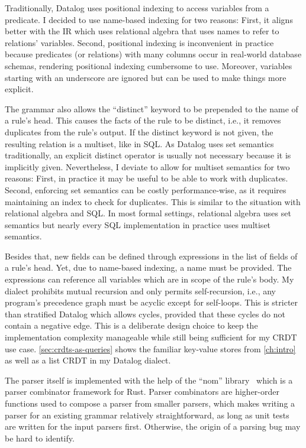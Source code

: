 Traditionally, Datalog uses positional indexing to access variables from a
predicate. I decided to use name-based indexing for two reasons:
First, it aligns better with the \ac{IR} which uses relational algebra
that uses names to refer to relations' variables.
Second, positional indexing is inconvenient in practice because
predicates (or relations) with many columns occur in real-world
database schemas, rendering positional indexing cumbersome to use.
Moreover, variables starting with an underscore are ignored but can be used
to make things more explicit.

The grammar also allows the ``distinct'' keyword to be prepended to the name
of a rule's head.
This causes the facts of the rule to be distinct, i.e., it removes duplicates
from the rule's output.
If the distinct keyword is not given, the resulting relation is a multiset,
like in SQL.
As Datalog uses set semantics traditionally, an explicit distinct operator
is usually not necessary because it is implicitly given.
Nevertheless, I deviate to allow for multiset semantics for two reasons:
First, in practice it may be useful to be able to work with duplicates.
Second, enforcing set semantics can be costly performance-wise,
as it requires maintaining an index to check for duplicates.
This is similar to the situation with relational algebra and SQL.
In most formal settings, relational algebra uses set semantics but nearly
every SQL implementation in practice uses multiset semantics.

Besides that, new fields can be defined through expressions in the list of fields
of a rule's head.
Yet, due to name-based indexing, a name must be provided.
The expressions can reference all variables which are in scope of the rule's body.
My dialect prohibits mutual recursion and only permits self-recursion, i.e.,
any program's precedence graph must be acyclic except for self-loops.
This is stricter than stratified Datalog which allows cycles,
provided that these cycles do not contain a negative edge.
This is a deliberate design choice to keep the implementation complexity manageable
while still being sufficient for my \ac{CRDT} use case.
\ref{sec:crdts-as-queries} shows the familiar key-value stores from \ref{ch:intro}
as well as a list \ac{CRDT} in my Datalog dialect.

The parser itself is implemented with the help of the ``nom'' library~\cite{nom}
which is a parser combinator framework for Rust.
Parser combinators are higher-order functions used to compose a parser
from smaller parsers, which makes writing a parser for an existing grammar
relatively straightforward, as long as unit tests are written for the input
parsers first. Otherwise, the origin of a parsing bug may be hard to identify.

